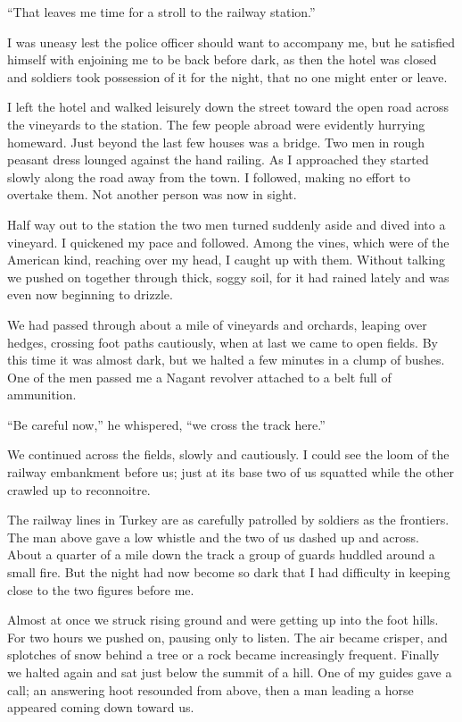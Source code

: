 \documentclass[a5paper,12pt]{book}
\begin{document}
“That leaves me time for a stroll to the railway station.”

I was uneasy lest the police officer should want to accompany me, but he satisfied himself with enjoining me to be back before dark, as then the hotel was closed and soldiers took possession of it for the night, that no one might enter or leave.

I left the hotel and walked leisurely down the street toward the open road across the vineyards to the station. The few people abroad were evidently hurrying homeward. Just beyond the last few houses was a bridge. Two men in rough peasant dress lounged against the hand railing. As I approached they started slowly along the road away from the town. I followed, making no effort to overtake them. Not another person was now in sight.

Half way out to the station the two men turned suddenly aside and dived into a vineyard. I quickened my pace and followed. Among the vines, which were of the American kind, reaching over my head, I caught up with them. Without talking we pushed on together through thick, soggy soil, for it had rained lately and was even now beginning to drizzle.

We had passed through about a mile of vineyards and orchards, leaping over hedges, crossing foot paths cautiously, when at last we came to open fields. By this time it was almost dark, but we halted a few minutes in a clump of bushes. One of the men passed me a Nagant revolver attached to a belt full of ammunition.

“Be careful now,” he whispered, “we cross the track here.”

We continued across the fields, slowly and cautiously. I could see the loom of the railway embankment before us; just at its base two of us squatted while the other crawled up to reconnoitre.

The railway lines in Turkey are as carefully patrolled by soldiers as the frontiers. The man above gave a low whistle and the two of us dashed up and across. About a quarter of a mile down the track a group of guards huddled around a small fire. But the night had now become so dark that I had difficulty in keeping close to the two figures before me.

Almost at once we struck rising ground and were getting up into the foot hills. For two hours we pushed on, pausing only to listen. The air became crisper, and splotches of snow behind a tree or a rock became increasingly frequent. Finally we halted again and sat just below the summit of a hill. One of my guides gave a call; an answering hoot resounded from above, then a man leading a horse appeared coming down toward us.
\end{document}
